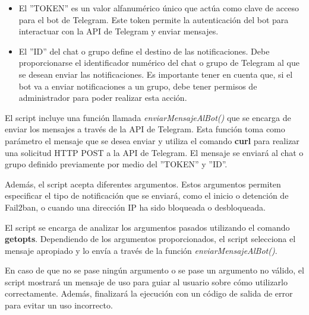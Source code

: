 		\begin{itemize}
			\item 	El ''TOKEN'' es un valor alfanumérico único que actúa como clave de acceso para el bot de Telegram. Este token permite la autenticación del bot para interactuar con la API de Telegram y enviar mensajes.
			\item 	El ''ID'' del chat o grupo define el destino de las notificaciones. Debe proporcionarse el identificador numérico del chat o grupo de Telegram al que se desean enviar las notificaciones. Es importante tener en cuenta que, si el bot va a enviar notificaciones a un grupo, debe tener permisos de administrador para poder realizar esta acción.
		\end{itemize}
	

		El script incluye una función llamada \textit{enviarMensajeAlBot()} que se encarga de enviar los mensajes a través de la API de Telegram. Esta función toma como parámetro el mensaje que se desea enviar y utiliza el comando \textbf{curl} para realizar una solicitud HTTP POST a la API de Telegram. El mensaje se enviará al chat o grupo definido previamente por medio del ''TOKEN'' y ''ID''.\par
		
		Además, el script acepta diferentes argumentos. Estos argumentos permiten especificar el tipo de notificación que se enviará, como el inicio o detención de Fail2ban, o cuando una dirección IP ha sido bloqueada o desbloqueada.\par
		
		El script se encarga de analizar los argumentos pasados utilizando el comando \textbf{getopts}. Dependiendo de los argumentos proporcionados, el script selecciona el mensaje apropiado y lo envía a través de la función \textit{enviarMensajeAlBot()}.\par
		
		En caso de que no se pase ningún argumento o se pase un argumento no válido, el script mostrará un mensaje de uso para guiar al usuario sobre cómo utilizarlo correctamente. Además, finalizará la ejecución con un código de salida de error para evitar un uso incorrecto.\par
		
